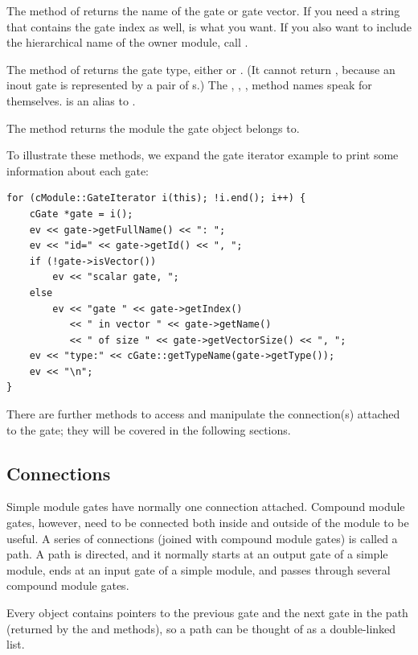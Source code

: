The  method of  returns the name of the
gate or gate vector. If you need a string that contains the gate index
as well,  is what you want. If you also want to
include the hierarchical name of the owner module, call .

The  method of  returns the gate type,
either  or . (It cannot return
, because an inout gate is represented by a pair
of s.) The , ,
,  method names speak for themselves.
 is an alias to .

The  method returns the module the gate object
belongs to.

To illustrate these methods, we expand the gate iterator example
to print some information about each gate:

\begin{verbatim}
for (cModule::GateIterator i(this); !i.end(); i++) {
    cGate *gate = i();
    ev << gate->getFullName() << ": ";
    ev << "id=" << gate->getId() << ", ";
    if (!gate->isVector())
        ev << "scalar gate, ";
    else
        ev << "gate " << gate->getIndex()
           << " in vector " << gate->getName()
           << " of size " << gate->getVectorSize() << ", ";
    ev << "type:" << cGate::getTypeName(gate->getType());
    ev << "\n";
}
\end{verbatim}

There are further  methods to access and manipulate
the connection(s) attached to the gate; they will be covered in the
following sections.


\subsection{Connections}

Simple module gates have normally one connection attached. Compound module
gates, however, need to be connected both inside and outside of the
module to be useful. A series of connections (joined with compound
module gates) is called a path. A path is directed, and it normally
starts at an output gate of a simple module, ends at an input gate
of a simple module, and passes through several compound module gates.

Every  object contains pointers to the previous gate
and the next gate in the path (returned by the 
and  methods), so a path can be thought of as
a double-linked list.

